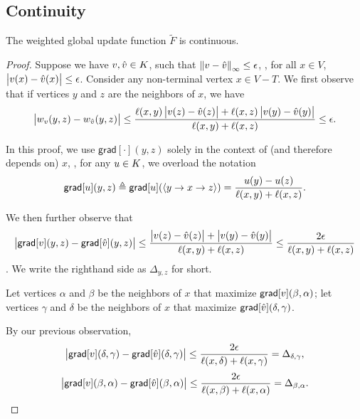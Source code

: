 \documentclass[12pt]{amsart}
\newcommand{\grad}{\ensuremath{\mathsf{grad}}}
\renewcommand{\path}[1]{\ensuremath{\langle {#1} \rangle}}
\begin{document}
\subsection{Continuity}
\begin{lemma}\label{lem:wtdcontinuity}
The weighted global update function $\tilde{F}$ is continuous.
\end{lemma}
\begin{proof}
Suppose we have $v, \hat{v}\in K$, such that $\left\lVert v-\hat{v} \right\rVert_{\infty}\leq \epsilon$, \ie, for all $x\in V$, $\left| v(x)-\hat{v}(x) \right| \leq \epsilon$. Consider any non-terminal vertex $x\in V-T$. We first observe that if vertices $y$ and $z$ are the neighbors of $x$, we have
\begin{equation}\label{eq:valueobs}
\left| w_{v}(y,z)-w_{\hat{v}}(y,z) \right| \leq \frac{\ell(x,y)\left| v(z)-\hat{v}(z) \right| + \ell(x,z)\left| v(y)-\hat{v}(y) \right|}{\ell(x,y)+\ell(x,z)} \leq \epsilon.
\end{equation}

In this proof, we use $\grad[\cdot](y,z)$ solely in the context of (and therefore depends on) $x$, \ie, for any $u\in K$, we overload the notation $$\grad[\V{u}](y,z) \triangleq \grad[\V{u}](\path{y\to x\to z}) = \frac{\V{u}(y)-\V{u}(z)}{\ell(x,y)+\ell(x,z)}.$$

We then further observe that $$\abs{\grad[\V{v}](y,z)-\grad[\V{\hat{v}}](y,z)} \leq \frac{\abs{\V{v}(z)-\V{\hat{v}}(z)} + \abs{\V{v}(y)-\V{\hat{v}}(y)}}{\ell(x,y)+\ell(x,z)} \leq \frac{2\epsilon}{\ell(x,y)+\ell(x,z)}$$. We write the righthand side as $\Delta_{y,z}$ for short.

Let vertices $\alpha$ and $\beta$ be the neighbors of $x$ that maximize $\grad[\V{v}](\beta,\alpha)$; let vertices $\gamma$ and $\delta$ be the neighbors of $x$ that maximize $\grad[\V{\hat{v}}](\delta,\gamma)$.


By our previous observation,
\begin{equation}\label{eq:deltagamma}
\abs{\grad[\V{v}](\delta,\gamma)-\grad[\V{\hat{v}}](\delta,\gamma)}\leq\frac{2\epsilon}{\ell(x,\delta)+\ell(x,\gamma)} = \Delta_{\delta,\gamma},
\end{equation}
\begin{equation}\label{eq:betaalpha}
\abs{\grad[\V{v}](\beta,\alpha)-\grad[\V{\hat{v}}](\beta,\alpha)}\leq\frac{2\epsilon}{\ell(x,\beta)+\ell(x,\alpha)} = \Delta_{\beta,\alpha}.
\end{equation}


\end{proof}
\end{document}
